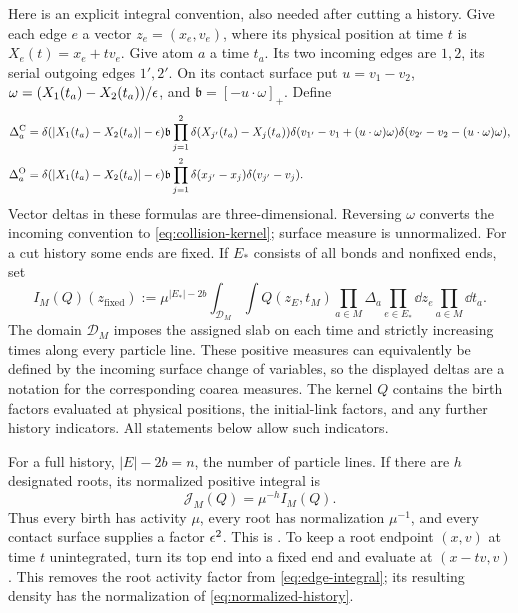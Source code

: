 Here is an explicit integral convention, also needed after cutting a
history. Give each edge \(e\) a vector \(z_e=(x_e,v_e)\), where its
physical position at time \(t\) is \(X_e(t)=x_e+tv_e\). Give atom \(a\)
a time \(t_a\). Its two incoming edges are \(1,2\), its serial outgoing
edges \(1',2'\). On its contact surface put
\(u=v_1-v_2\), \(\omega=(X_1(t_a)-X_2(t_a))/\epsilon\), and
\(\mathfrak b=[-u\cdot\omega]_+\). Define
\begin{align}
 \Delta_a^{\mathrm C}
 &=\delta(|X_1(t_a)-X_2(t_a)|-\epsilon)\mathfrak b
   \prod_{j=1}^2\delta(X_{j'}(t_a)-X_j(t_a))
   \delta(v_{1'}-v_1+(u\cdot\omega)\omega)
   \delta(v_{2'}-v_2-(u\cdot\omega)\omega),\label{eq:atom-C}\\
 \Delta_a^{\mathrm O}
 &=\delta(|X_1(t_a)-X_2(t_a)|-\epsilon)\mathfrak b
   \prod_{j=1}^2\delta(x_{j'}-x_j)\delta(v_{j'}-v_j).
   \label{eq:atom-O}
\end{align}
Vector deltas in these formulas are three-dimensional. Reversing
\(\omega\) converts the incoming convention to
\eqref{eq:collision-kernel}; surface measure is unnormalized.
For a cut history some ends are fixed. If \(E_*\) consists of all bonds
and nonfixed ends, set
\begin{equation}\label{eq:edge-integral}
 I_M(Q)(z_{\mathrm{fixed}})
 :=\mu^{|E_*|-2b}
   \int_{\mathcal D_M}\int
    Q(z_E,t_M)\prod_{a\in M}\Delta_a
       \prod_{e\in E_*}\dd z_e\prod_{a\in M}\dd t_a.
\end{equation}
The domain \(\mathcal D_M\) imposes the assigned slab on each time and
strictly increasing times along every particle line. These positive
measures can equivalently be defined by the incoming surface change of
variables, so the displayed deltas are a notation for the corresponding
coarea measures. The kernel \(Q\) contains the birth factors evaluated
at physical positions, the initial-link factors, and any further
history indicators. All statements below allow such indicators.

For a full history, \(|E|-2b=n\), the number of particle lines. If there
are \(h\) designated roots, its normalized positive integral is
\begin{equation}\label{eq:normalized-history}
 \mathcal J_M(Q)=\mu^{-h}I_M(Q).
\end{equation}
Thus every birth has activity \(\mu\), every root has normalization
\(\mu^{-1}\), and every contact surface supplies a factor \(\epsilon^2\).
This is \cite[Proposition 7.5, Equation (7.7)]{DHM2025}. To keep a root
endpoint \((x,v)\) at time \(t\) unintegrated, turn its top end into a
fixed end and evaluate at \((x-tv,v)\). This removes the root activity
factor from \eqref{eq:edge-integral}; its resulting density has the
normalization of \eqref{eq:normalized-history}.

